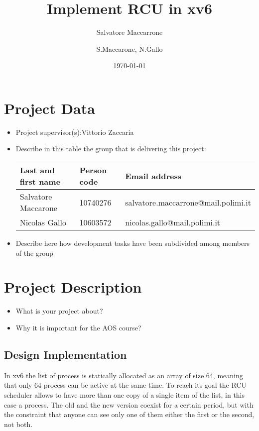 \documentclass{article}
\author{Salvatore Maccarrone}
\author{S.Maccarone, N.Gallo}
\date{\today}
\title{Implement RCU in xv6}
\begin{document}
\maketitle


\section{Project Data}
\begin{itemize}
\item 
  Project supervisor(s):Vittorio Zaccaria
\item 
Describe in this table the group that is delivering this project:

\begin{center}
\begin{tabular}{lll}
Last and first name & Person code & Email address\\
\hline
  Salvatore Maccarone & 10740276 & salvatore.maccarrone@mail.polimi.it \\
  Nicolas Gallo & 10603572 & nicolas.gallo@mail.polimi.it                     
\end{tabular}
\end{center}
\item
Describe here how development tasks have been subdivided among members
of the group

\end{itemize}



\section{Project Description}

\begin{itemize}
\item What is your project about?
\item Why it is important for the AOS course?
\end{itemize}

\subsection{Design Implementation}

In xv6 the list of process is statically allocated as an array of size 64, meaning that only 64 process can be active at the same time. To reach its goal the RCU scheduler allows to have more than one copy of a single item of the list, in this case a process. The old and the new version coexist for a certain period, but with the constraint that anyone can see only one of them either the first or the second, not both. 
\end{document}

